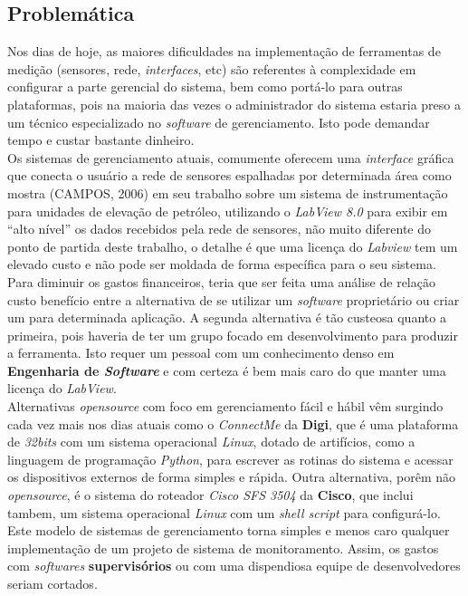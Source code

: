 \documentclass[a4paper, 12pt]{article}
\begin{document}
\subsection{Problemática}
\indent\indent Nos dias de hoje, as maiores dificuldades na implementação de ferramentas de medição (sensores, rede, \textit{interfaces}, etc) são referentes à 
complexidade em configurar a parte gerencial do sistema, bem como portá-lo para outras plataformas, pois na maioria das vezes o administrador do 
sistema estaria preso a um técnico especializado no \textit{software} de gerenciamento. Isto pode demandar tempo e custar bastante dinheiro.
\\
\indent Os sistemas de gerenciamento atuais, comumente oferecem uma \textit{interface} gráfica que conecta o usuário a rede de sensores espalhadas por determinada 
área como mostra (CAMPOS, 2006) em seu trabalho sobre um sistema de instrumentação para unidades de elevação de petróleo, utilizando o \textit{LabView 8.0} para 
exibir em “alto nível” os dados recebidos pela rede de sensores, não muito diferente do ponto de partida deste trabalho, o detalhe é que uma licença do 
\textit{Labview}  tem um elevado custo e não pode ser moldada de forma específica para o seu sistema. 
\\
\indent Para diminuir os gastos financeiros, teria que ser feita uma análise de relação custo benefício entre a alternativa de se utilizar um \textit{software} 
proprietário ou criar um para determinada aplicação. A segunda alternativa é tão custeosa quanto a primeira, pois haveria de ter um grupo focado em 
desenvolvimento para produzir a ferramenta. Isto requer um pessoal com um conhecimento denso em \textbf{Engenharia de \textit{Software}} e com certeza é bem mais caro do 
que manter uma licença do \textit{LabView}. 
\\
\indent Alternativas \textit{opensource} com foco em gerenciamento fácil e hábil vêm surgindo cada vez mais nos dias atuais como o \textit{ConnectMe} da \textbf{Digi}, que é uma 
plataforma de \textit{32bits} com um sistema operacional \textit{Linux}, dotado de artifícios, como a linguagem de programação \textit{Python}, para escrever as rotinas do sistema 
e acessar os dispositivos externos de forma simples e rápida. Outra alternativa, porêm não \textit{opensource}, é o sistema do roteador 
\textit{Cisco SFS 3504} da \textbf{Cisco}, que inclui tambem, um sistema operacional \textit{Linux} com um \textit{shell script} para configurá-lo. Este modelo de sistemas de gerenciamento 
torna simples e menos caro qualquer implementação de um projeto de sistema de monitoramento. Assim, os gastos com \textit{softwares} \textbf{supervisórios} ou com uma 
dispendiosa equipe de desenvolvedores seriam cortados.
\end{document}
